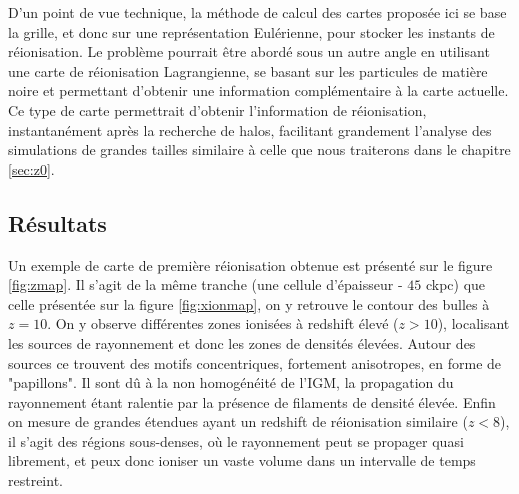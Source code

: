 D'un point de vue technique, la méthode de calcul des cartes proposée ici se base la grille, et donc sur une représentation Eulérienne, pour stocker les instants de réionisation.
Le problème pourrait être abordé sous un autre angle en utilisant une carte de réionisation Lagrangienne, se basant sur les particules de matière noire et permettant d'obtenir une information complémentaire à la carte actuelle.
Ce type de carte permettrait d'obtenir l'information de réionisation, instantanément après la recherche de halos, facilitant grandement l'analyse des simulations de grandes tailles similaire à celle que nous traiterons dans le chapitre \ref{sec:z0}.


\subsection{Résultats}
Un exemple de carte de première réionisation obtenue est présenté sur le figure \ref{fig:zmap}.
Il s'agit de la même tranche (une cellule d’épaisseur - $45$ ckpc) que celle présentée sur la figure \ref{fig:xionmap}, on y retrouve le contour des bulles à $z=10$.
On y observe différentes zones ionisées à redshift élevé ($z>10$), localisant les sources de rayonnement et donc les zones de densités élevées.
Autour des sources ce trouvent des motifs concentriques, fortement anisotropes, en forme de "papillons".
Il sont dû à la non homogénéité de l'\ac{IGM}, la propagation du rayonnement étant ralentie par la présence de filaments de densité élevée.
Enfin on mesure de grandes étendues ayant un redshift de réionisation similaire ($z<8$), il s'agit des régions sous-denses, où le rayonnement peut se propager quasi librement, et peux donc ioniser un vaste volume dans un intervalle de temps restreint.

